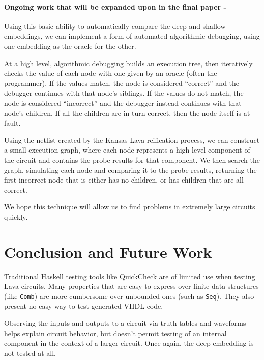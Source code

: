 \documentclass{llncs}
\begin{document}
\paragraph{Ongoing work that will be expanded upon in the final paper - }
Using this basic ability to automatically compare the deep and shallow embeddings,
we can implement a form of automated algorithmic debugging, using one embedding as the
oracle for the other.

At a high level, algorithmic debugging builds an execution tree, then iteratively
checks the value of each node with one given by an oracle (often the programmer).
If the values match, the node is considered ``correct'' and the debugger continues
with that node's siblings. If the values do not match, the node is considered
``incorrect'' and the debugger instead continues with that node's children. If
all the children are in turn correct, then the node itself is at fault.


Using the netlist created by the Kansas Lava reification process, we can construct
a small execution graph, where each node represents a high level component of
the circuit and contains the probe results for that component. We then search the
graph, simulating each node and comparing it to the probe results, returning
the first incorrect node that is either has no children, or has children that
are all correct.


We hope this technique will allow us to find problems in extremely large circuits quickly.


\section{Conclusion and Future Work}

Traditional Haskell testing tools like QuickCheck are of limited use
when testing Lava circuits. Many properties that are easy to express
over finite data structures (like \verb!Comb!) are more cumbersome
over unbounded ones (such as \verb!Seq!). They also present no easy
way to test generated VHDL code.

Observing the inputs and outputs to a circuit via truth tables and
waveforms helps explain circuit behavior, but doesn't permit testing
of an internal component in the context of a larger circuit. Once again,
the deep embedding is not tested at all.
\end{document}
